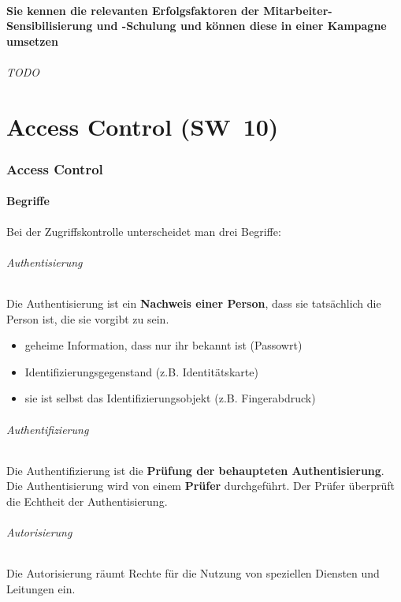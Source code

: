 \documentclass[10pt,a4paper]{article}
\begin{document}
\subsection*{Sie kennen die relevanten Erfolgsfaktoren der Mitarbeiter-Sensibilisierung und -Schulung und können diese in einer Kampagne umsetzen}
\paragraph*{TODO}


\part{Access Control (SW~10)}
\section{Access Control}
\subsection*{Begriffe}Bei der Zugriffskontrolle unterscheidet man drei Begriffe:

\paragraph*{Authentisierung}Die Authentisierung ist ein \textbf{Nachweis einer Person}, dass sie tatsächlich die Person ist, die sie vorgibt zu sein.
\begin{itemize}[noitemsep,topsep=0pt,leftmargin=*]
    \item geheime Information, dass nur ihr bekannt ist (Passowrt)
    \item Identifizierungsgegenstand (z.B. Identitätskarte)
    \item sie ist selbst das Identifizierungsobjekt (z.B. Fingerabdruck)
\end{itemize}


\paragraph*{Authentifizierung}Die Authentifizierung ist die \textbf{Prüfung der behaupteten Authentisierung}. Die Authentisierung wird von einem \textbf{Prüfer} durchgeführt. Der Prüfer überprüft die Echtheit der Authentisierung.

\paragraph*{Autorisierung}Die Autorisierung räumt Rechte für die Nutzung von speziellen Diensten und Leitungen ein.
\end{document}
